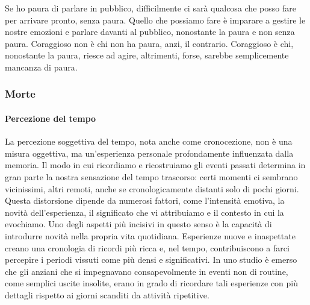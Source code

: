 \documentclass[12pt]{book} %
\begin{document}
Se ho paura di parlare in pubblico, difficilmente ci sarà qualcosa che posso fare per arrivare pronto, senza paura. Quello che possiamo fare è imparare a gestire le nostre emozioni e parlare davanti al pubblico, nonostante la paura e non senza paura. Coraggioso non è chi non ha paura, anzi, il contrario. Coraggioso è chi, nonostante la paura, riesce ad agire, altrimenti, forse, sarebbe semplicemente mancanza di paura.

\subsubsection{Morte}
\paragraph{Percezione del tempo}

La percezione soggettiva del tempo, nota anche come cronocezione, non è una misura oggettiva, ma un’esperienza personale profondamente influenzata dalla memoria. Il modo in cui ricordiamo e ricostruiamo gli eventi passati determina in gran parte la nostra sensazione del tempo trascorso: certi momenti ci sembrano vicinissimi, altri remoti, anche se cronologicamente distanti solo di pochi giorni. Questa distorsione dipende da numerosi fattori, come l’intensità emotiva, la novità dell’esperienza, il significato che vi attribuiamo e il contesto in cui la evochiamo.
Uno degli aspetti più incisivi in questo senso è la capacità di introdurre novità nella propria vita quotidiana. Esperienze nuove e inaspettate creano una cronologia di ricordi più ricca e, nel tempo, contribuiscono a farci percepire i periodi vissuti come più densi e significativi. In uno studio è emerso che gli anziani che si impegnavano consapevolmente in eventi non di routine, come semplici uscite insolite, erano in grado di ricordare tali esperienze con più dettagli rispetto ai giorni scanditi da attività ripetitive. 
\end{document}
